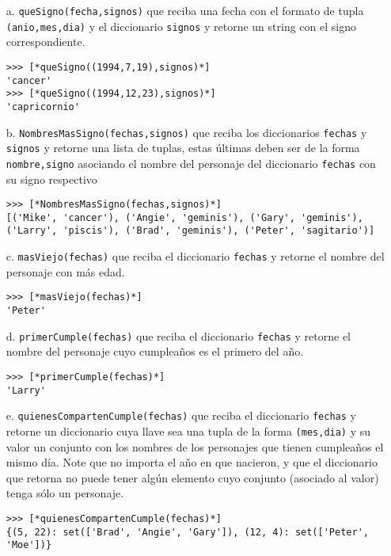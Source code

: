 \begin{itemize}
\item[a.] \texttt{queSigno(fecha,signos)} que reciba una fecha con el formato de tupla \texttt{(anio,mes,dia)} y el diccionario \texttt{signos} y retorne un string con el signo correspondiente.

\begin{lstlisting}[style=consola]
>>> [*queSigno((1994,7,19),signos)*]
'cancer'
>>> [*queSigno((1994,12,23),signos)*]
'capricornio'
\end{lstlisting}

\item[b.] \texttt{NombresMasSigno(fechas,signos)} que reciba los diccionarios \texttt{fechas} y \texttt{signos} y retorne una lista de tuplas, estas últimas deben ser de la forma \texttt{nombre,signo} asociando el nombre del personaje del diccionario \texttt{fechas} con su signo respectivo

\begin{lstlisting}[style=consola]
>>> [*NombresMasSigno(fechas,signos)*]
[('Mike', 'cancer'), ('Angie', 'geminis'), ('Gary', 'geminis'), 
('Larry', 'piscis'), ('Brad', 'geminis'), ('Peter', 'sagitario')]
\end{lstlisting}

\item[c.] \texttt{masViejo(fechas)} que reciba el diccionario \texttt{fechas} y retorne el nombre del personaje con más edad.

\begin{lstlisting}[style=consola]
>>> [*masViejo(fechas)*]
'Peter'
\end{lstlisting}

\item[d.] \texttt{primerCumple(fechas)} que reciba el diccionario \texttt{fechas} y retorne el nombre del personaje cuyo cumpleaños es el primero del año.

\begin{lstlisting}[style=consola]
>>> [*primerCumple(fechas)*]
'Larry'
\end{lstlisting}

\item[e.] \texttt{quienesCompartenCumple(fechas)} que reciba el diccionario \texttt{fechas} y retorne un diccionario cuya llave sea una tupla de la forma \texttt{(mes,dia)} y su valor un conjunto con los nombres de los personajes que tienen cumpleaños el mismo día. Note que no importa el año en que nacieron, y que el diccionario que retorna no puede tener algún elemento cuyo conjunto (asociado al valor) tenga sólo un personaje.

\begin{lstlisting}[style=consola]
>>> [*quienesCompartenCumple(fechas)*]
{(5, 22): set(['Brad', 'Angie', 'Gary']), (12, 4): set(['Peter', 'Moe'])}
\end{lstlisting}

\end{itemize}